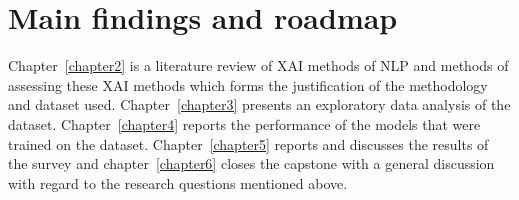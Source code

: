 \section{Main findings and roadmap}
Chapter~\ref{chapter2} is a literature review of XAI methods of NLP and methods of assessing these XAI methods which forms the justification of the methodology and dataset used. Chapter~\ref{chapter3} presents an exploratory data analysis of the dataset. Chapter~\ref{chapter4} reports the performance of the models that were trained on the dataset. Chapter~\ref{chapter5} reports and discusses the results of the survey and chapter~\ref{chapter6} closes the capstone with a general discussion with regard to the research questions mentioned above.